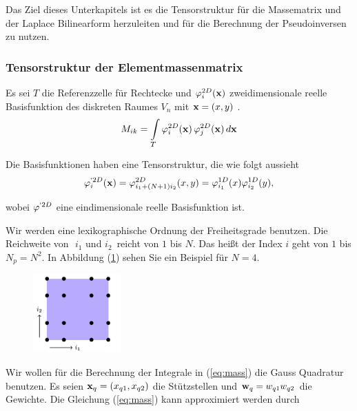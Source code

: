 Das Ziel dieses Unterkapitels ist es die Tensorstruktur für die Massematrix und der Laplace Bilinearform herzuleiten und für die Berechnung der Pseudoinversen zu nutzen. 

\subsubsection{Tensorstruktur der Elementmassenmatrix}
Es sei $T$ die Referenzzelle für Rechtecke und $\varphi^{2D}_i(\bold{x})$ zweidimensionale reelle Basisfunktion des diskreten Raumes $V_n$ mit $\bold{x}=(x,y)$ .
\begin{equation} \label{eq:mass}
M_{ik} = \int\limits_{T} \varphi^{2D}_i (\bold{x}) \, \varphi^{2D}_j (\bold{x}) \, d\bold{x}
\end{equation}

Die Basisfunktionen haben eine Tensorstruktur, die wie folgt aussieht
\begin{equation} \label{eq:tensor}
\varphi^{`2D}_i(\bold{x})=\varphi^{2D}_{i_1+(N+1)i_2}(x,y)=\varphi^{1D}_{i_1}(x)\varphi^{1D}_{i_2}(y),
\end{equation}

wobei $\varphi^{`2D}$ eine eindimensionale reelle Basisfunktion ist.

Wir werden eine lexikographische Ordnung der Freiheitsgrade benutzen. Die Reichweite von $\, \, i_1 $ und $ i_2 \, $ reicht von $1$ bis $N$. Das heißt der Index $i$ geht von $1$ bis $N_p=N^2$. In Abbildung (\ref{fig:lexi}) sehen Sie ein Beispiel für $N=4$.

\begin{figure}[ht] 
	\centering
  \includegraphics[width=0.3\textwidth]{lexi.png}
	\caption{ \cite[3]{Teachlet}}
	\label{fig:lexi}
\end{figure}

Wir wollen für die Berechnung der Integrale in (\ref{eq:mass}) die Gauss Quadratur benutzen.
Es seien $\bold{x}_q=(x_{q1},x_{q2})$ die Stützstellen und $\bold{w}_q=w_{q1}w_{q2}$ die Gewichte. Die Gleichung (\ref{eq:mass}) kann approximiert werden durch

